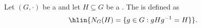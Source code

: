 \begin{definition}[Normalizer] \label{definition:normalizer_of_a_subgroup_of_a_group}
Let $(G,\cdot)$ be a  and let $H \subseteq G$ be a . The  is defined as
$$\hlin{N_G(H) = \{ g \in G : g H g^{-1} = H \}}.$$
\end{definition}
